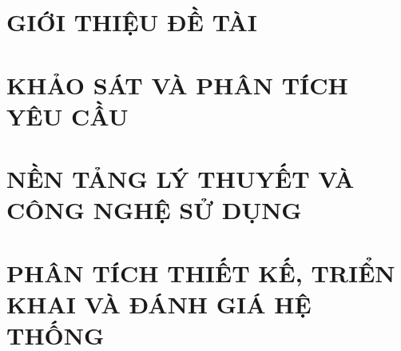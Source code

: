 \documentclass[a4paper,12pt,twoside,openany]{report}
\renewcommand{\_}{\reportunderscore\allowbreak}
\theoremstyle{definition}
\begin{document}
\renewcommand{\listtablename}{DANH MỤC BẢNG BIỂU}
{\let\oldnumberline\numberline
\renewcommand{\numberline}{Bảng~\oldnumberline}
\listoftables}

\glsaddall 
 \renewcommand*{\glossaryname}{Danh sách thuật ngữ}
\renewcommand*{\acronymname}{DANH MỤC THUẬT NGỮ VÀ TỪ VIẾT TẮT}
\renewcommand*{\entryname}{Thuật ngữ}
\renewcommand*{\descriptionname}{Ý nghĩa}
\renewcommand*{\glossarysection}[2][]{%
  {\centering\bfseries\Large #2\par}
  \vspace{20pt}
}
\printnoidxglossary[type=\acronymtype]


% 


\newpage
{}
\hypersetup{pageanchor=true}

\pagestyle{fancy}
\fancyhf{}
\fancyhead[RE, LO]{\footnotesize\nouppercase{\leftmark}}
\fancyfoot[RE, LO]{\thepage}

\chapter{GIỚI THIỆU ĐỀ TÀI}
\label{chapter:Introduction}

\newpage
\chapter{KHẢO SÁT VÀ PHÂN TÍCH YÊU CẦU}
\label{chapter:Related_works}



\newpage
\chapter{NỀN TẢNG LÝ THUYẾT VÀ CÔNG NGHỆ SỬ DỤNG}
\label{chapter:Methodology}


\newpage
\chapter{PHÂN TÍCH THIẾT KẾ, TRIỂN KHAI VÀ ĐÁNH GIÁ HỆ THỐNG}
\label{chapter:Experiment}

\end{document}
